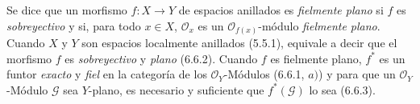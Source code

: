 \begin{env}[6.7.8]
\label{0.6.7.8-fr}
Se dice que un morfismo $f:X\to Y$ de espacios anillados es \emph{fielmente plano} si
$f$ es \emph{sobreyectivo} y si, para todo $x\in X$, $\mathcal O_x$ es un
$\mathcal O_{f(x)}$-módulo \emph{fielmente plano}. Cuando $X$ y $Y$ son
espacios localmente anillados (5.5.1), equivale a decir que el
morfismo $f$ es \emph{sobreyectivo} y \emph{plano} (6.6.2). Cuando $f$ es fielmente plano,
$f^*$ es un funtor \emph{exacto} y \emph{fiel} en la categoría de los
$\mathcal O_Y$-Módulos (6.6.1, $a)$) y para que un $\mathcal O_Y$-Módulo
$\mathcal G$ sea $Y$-plano, es necesario y suficiente que $f^*(\mathcal G)$ lo
sea (6.6.3).
\end{env}

